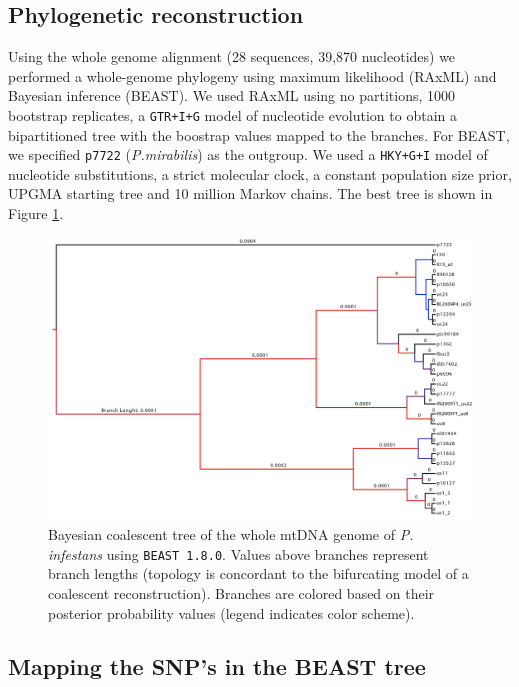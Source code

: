 \documentclass{article}\usepackage[]{graphicx}\usepackage[]{color}
\begin{document}
\subsection{Phylogenetic reconstruction}
Using the whole genome alignment (28 sequences, 39,870 nucleotides) we performed a whole-genome phylogeny using maximum likelihood (RAxML) and Bayesian inference (BEAST). We used RAxML using no partitions, 1000 bootstrap replicates, a \texttt{GTR+I+G} model of nucleotide evolution to obtain a bipartitioned tree with the boostrap values mapped to the branches. For BEAST, we specified \texttt{p7722} (\emph{P.mirabilis}) as the outgroup. We used a \texttt{HKY+G+I} model of nucleotide substitutions, a strict molecular clock, a constant population size prior, UPGMA starting tree and 10 million Markov chains. The best tree is shown in Figure \ref{fig:BEAST}.

\begin{figure}[p]
\centering
\includegraphics[width=1.0\textwidth]{mtdna_alin.jpg}
\caption[BEAST Coalescent tree]{Bayesian coalescent tree of the whole mtDNA genome of \emph{P. infestans} using \texttt{BEAST 1.8.0}. Values above branches represent branch lengths (topology is concordant to the bifurcating model of a coalescent reconstruction). Branches are colored based on their posterior probability values (legend indicates color scheme).}
\label{fig:BEAST}
\end{figure}

\subsection{Mapping the SNP's in the BEAST tree}
\end{document}
